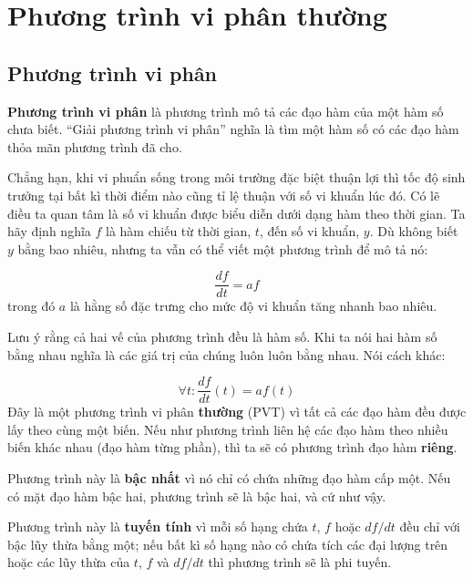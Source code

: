 \documentclass[12pt]{book}
\begin{document}



\chapter{Phương trình vi phân thường}


\section{Phương trình vi phân}

{\bf Phương trình vi phân} là phương trình mô tả các đạo hàm của
một hàm số chưa biết. ``Giải phương trình vi phân'' nghĩa là tìm
một hàm số có các đạo hàm thỏa mãn phương trình đã cho.

Chẳng hạn, khi vi phuẩn sống trong môi trường đặc biệt thuận
lợi thì tốc độ sinh trưởng tại bất kì thời điểm nào cũng tỉ lệ thuận
với số vi khuẩn lúc đó. Có lẽ điều ta quan tâm là số vi khuẩn được
biểu diễn dưới dạng hàm theo thời gian. Ta hãy định nghĩa 
$f$ là hàm chiếu từ thời gian, $t$, đến số vi khuẩn, $y$.  Dù không
biết $y$ bằng bao nhiêu, nhưng ta vẫn có thể viết một phương trình 
để mô tả nó:

\[ \frac{df}{dt} = a f \]
%
trong đó $a$ là hằng số đặc trưng cho mức độ vi khuẩn tăng 
nhanh bao nhiêu.

Lưu ý rằng cả hai vế của phương trình đều là hàm số. Khi ta nói
hai hàm số bằng nhau nghĩa là các giá trị của chúng luôn luôn
bằng nhau. Nói cách khác:

\[ \forall t: \frac{df}{dt}(t) = a f(t) \]
%
Đây là một phương trình vi phân {\bf thường} (PVT) vì tất cả các
đạo hàm đều được lấy theo cùng một biến. Nếu như phương trình
liên hệ các đạo hàm theo nhiều biến khác nhau (đạo hàm từng
phần), thì ta sẽ có phương trình đạo hàm {\bf riêng}.

Phương trình này là {\bf bậc nhất} vì nó chỉ có chứa những đạo hàm
cấp một. Nếu có mặt đạo hàm bậc hai, phương trình sẽ là bậc hai, 
và cứ như vậy.

Phương trình này là {\bf tuyến tính} vì mỗi số hạng chứa $t$, $f$ hoặc
$df/dt$ đều chỉ với bậc lũy thừa bằng một; nếu bất kì số hạng nào
có chứa tích các đại lượng trên hoặc các lũy thừa của $t$, $f$ và 
$df/dt$ thì phương trình sẽ là phi tuyến.
\end{document}
